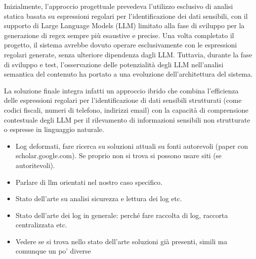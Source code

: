 \documentclass[12pt]{report}
\begin{document}
Inizialmente, l'approccio progettuale prevedeva l'utilizzo esclusivo di analisi statica basata su espressioni regolari per l'identificazione dei dati sensibili, con il supporto di Large Language Models (LLM) limitato alla fase di sviluppo per la generazione di regex sempre più esaustive e precise. Una volta completato il progetto, il sistema avrebbe dovuto operare esclusivamente con le espressioni regolari generate, senza ulteriore dipendenza dagli LLM. Tuttavia, durante la fase di sviluppo e test, l'osservazione delle potenzialità degli LLM nell'analisi semantica del contenuto ha portato a una evoluzione dell'architettura del sistema.

La soluzione finale integra infatti un approccio ibrido che combina l'efficienza delle espressioni regolari per l'identificazione di dati sensibili strutturati (come codici fiscali, numeri di telefono, indirizzi email) con la capacità di comprensione contestuale degli LLM per il rilevamento di informazioni sensibili non strutturate o espresse in linguaggio naturale.






%
%


\begin{itemize}
    \item Log deformati, fare ricerca su soluzioni attuali su fonti autorevoli (paper con scholar.google.com). Se proprio non si trova si possono usare siti (se autoritevoli).
    \item Parlare di llm orientati nel nostro caso specifico.
    \item Stato dell'arte su analisi sicurezza e lettura dei log etc.
    \item Stato dell'arte dei log in generale: perché fare raccolta di log, raccorta centralizzata etc.
    \item Vedere se si trova nello stato dell'arte soluzioni già presenti, simili ma comunque un po' diverse
\end{itemize}


\end{document}
